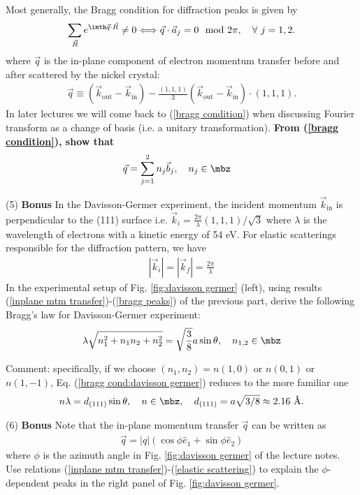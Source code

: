 Most generally, the Bragg condition for diffraction peaks is given by
\begin{align}\label{bragg condition}
\sum_{\vec R}e^{\imth\vec q\cdot\vec R}\neq0\Longleftrightarrow\vec q\cdot\vec a_j=0\mod2\pi,~~~\forall~j=1,2.
\end{align}
where $\vec q$ is the in-plane component of electron momentum transfer before and after scattered by the nickel crystal:
\begin{align}\label{inplane mtm transfer}
\vec q\equiv(\vec k_\text{out}-\vec k_\text{in})-\frac{(1,1,1)}3(\vec k_\text{out}-\vec k_\text{in})\cdot(1,1,1).
\end{align}
In later lectures we will come back to (\ref{bragg condition}) when discussing Fourier transform as a change of basis (i.e. a unitary transformation). \textbf{From (\ref{bragg condition}), show that
\begin{align}\label{bragg peaks}
&\vec q=\sum_{j=1}^2n_j\vec b_j,~~~n_j\in\mbz
\end{align}}

(5) \textbf{Bonus} In the Davisson-Germer experiment, the incident momentum $\vec k_\text{in}$ is perpendicular to the (111) surface i.e. $\vec k_i=\frac{2\pi}{\lambda}(1,1,1)/\sqrt{3}$ where $\lambda$ is the wavelength of electrons with a kinetic energy of 54 eV. For elastic scatterings responsible for the diffraction pattern, we have 
\begin{align}\label{elastic scattering}
|\vec k_i|=|\vec k_f|=\frac{2\pi}{\lambda}
\end{align}
In the experimental setup of Fig. \ref{fig:davisson germer} (left), using results (\ref{inplane mtm transfer})-(\ref{bragg peaks}) of the previous part, derive the following Bragg's law for Davisson-Germer experiment:
\begin{align}\label{bragg cond:davisson germer}
\lambda\sqrt{n_1^2+n_1n_2+n_2^2}=\sqrt{\frac38}a\sin\theta,~~~n_{1,2}\in\mbz
\end{align}

Comment: specifically, if we choose $(n_1,n_2)=n(1,0)$ or $n(0,1)$ or $n(1,-1)$, Eq. (\ref{bragg cond:davisson germer}) reduces to the more familiar one
\begin{align}
n\lambda=d_{(111)}\sin\theta,~~~n\in\mbz,~~~d_{(111)}=a\sqrt{3/8}\approx2.16~\text{\AA}.
\end{align}

(6) \textbf{Bonus} Note that the in-plane momentum transfer $\vec q$ can be written as
\begin{align}
\vec q=|q|(\cos\phi\hat e_1+\sin\phi\hat e_2)
\end{align}
where $\phi$ is the azimuth angle in Fig. \ref{fig:davisson germer} of the lecture notes. Use relations (\ref{inplane mtm transfer})-(\ref{elastic scattering}) to explain the $\phi$-dependent peaks in the right panel of Fig. \ref{fig:davisson germer}.


